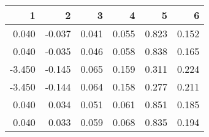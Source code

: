 \begin{table}[ht]
\centering
\begin{tabular}{rrrrrr}
  \hline
1 & 2 & 3 & 4 & 5 & 6 \\ 
  \hline
0.040 & -0.037 & 0.041 & 0.055 & 0.823 & 0.152 \\ 
  0.040 & -0.035 & 0.046 & 0.058 & 0.838 & 0.165 \\ 
  -3.450 & -0.145 & 0.065 & 0.159 & 0.311 & 0.224 \\ 
  -3.450 & -0.144 & 0.064 & 0.158 & 0.277 & 0.211 \\ 
  0.040 & 0.034 & 0.051 & 0.061 & 0.851 & 0.185 \\ 
  0.040 & 0.033 & 0.059 & 0.068 & 0.835 & 0.194 \\ 
   \hline
\end{tabular}
\end{table}
